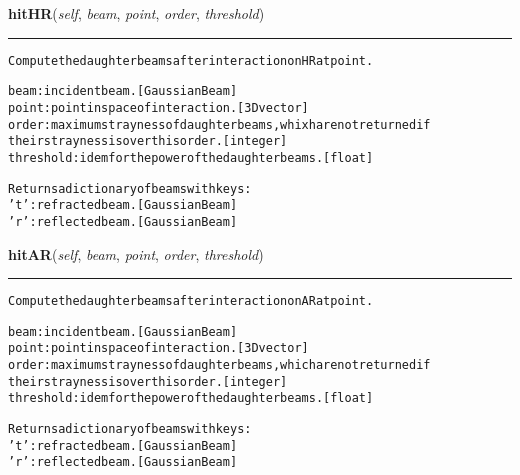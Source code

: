     \label{theia:optics:mirror:Mirror:hitHR}

    \vspace{0.5ex}

\hspace{.8\funcindent}\begin{boxedminipage}{\funcwidth}

    \raggedright \textbf{hitHR}(\textit{self}, \textit{beam}, \textit{point}, \textit{order}, \textit{threshold})

    \vspace{-1.5ex}

    \rule{\textwidth}{0.5\fboxrule}
\setlength{\parskip}{2ex}
\begin{alltt}
Compute the daughter beams after interaction on HR at point.

beam: incident beam. [GaussianBeam]
point: point in space of interaction. [3D vector]
order: maximum strayness of daughter beams, whixh are not returned if
    their strayness is over this order. [integer]
threshold: idem for the power of the daughter beams. [float]

Returns a dictionary of beams with keys:
    't': refracted beam. [GaussianBeam]
    'r': reflected beam. [GaussianBeam]
\end{alltt}

\setlength{\parskip}{1ex}
    \end{boxedminipage}

    \label{theia:optics:mirror:Mirror:hitAR}

    \vspace{0.5ex}

\hspace{.8\funcindent}\begin{boxedminipage}{\funcwidth}

    \raggedright \textbf{hitAR}(\textit{self}, \textit{beam}, \textit{point}, \textit{order}, \textit{threshold})

    \vspace{-1.5ex}

    \rule{\textwidth}{0.5\fboxrule}
\setlength{\parskip}{2ex}
\begin{alltt}
Compute the daughter beams after interaction on AR at point.

beam: incident beam. [GaussianBeam]
point: point in space of interaction. [3D vector]
order: maximum strayness of daughter beams, which are not returned if
    their strayness is over this order. [integer]
threshold: idem for the power of the daughter beams. [float]

Returns a dictionary of beams with keys:
    't': refracted beam. [GaussianBeam]
    'r': reflected beam. [GaussianBeam]
\end{alltt}

\setlength{\parskip}{1ex}
    \end{boxedminipage}


